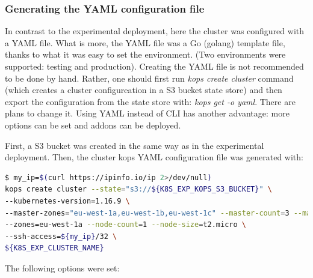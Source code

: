 \subsubsection{Generating the YAML configuration file}
In contrast to the experimental deployment, here the cluster was configured with a YAML file. What is more, the YAML file was a Go (golang) template file\cite{online-kops-ct}, thanks to what it was easy to set the environment. (Two environments were supported: testing and production). Creating the YAML file is not recommended to be done by hand. Rather, one should first run \textit{kops create cluster} command (which creates a cluster configureation in a S3 bucket state store) and then export the configuration from the state store with: \textit{kops get -o yaml}. There are plans to change it. Using YAML instead of CLI has another advantage: more options can be set\cite{online-kops-manifest} and addons can be deployed\cite{online-kops-addons}.

First, a S3 bucket was created in the same way as in the experimental deployment. Then, the cluster kops YAML configuration file was generated with:
\begin{lstlisting}[basicstyle=\tiny,caption={Commands used to generate a cluster configuration with kops},captionpos=b,language=Bash,xleftmargin=1cm]
$ my_ip=$(curl https://ipinfo.io/ip 2>/dev/null)
kops create cluster --state="s3://${K8S_EXP_KOPS_S3_BUCKET}" \
--kubernetes-version=1.16.9 \
--master-zones="eu-west-1a,eu-west-1b,eu-west-1c" --master-count=3 --master-size=t2.micro \
--zones=eu-west-1a --node-count=1 --node-size=t2.micro \
--ssh-access=${my_ip}/32 \
${K8S_EXP_CLUSTER_NAME}
\end{lstlisting}

The following options were set:

